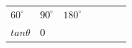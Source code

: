 {{\begin{center}
\begin{tabular}[t]{|l|l|l|l|l|l|l|}
    
        
                  \begin{math}{60}^{\circ }\end{math}
                 &
    
    
        
                  \begin{math}{90}^{\circ }\end{math}
                 &
    
    
        
                  \begin{math}{180}^{\circ }\end{math}
     \tabularnewline\cline{1-1}\cline{2-2}\cline{3-3}\cline{4-4}\cline{5-5}\cline{6-6}\cline{7-7}
    
    
        
                  \begin{math}tan\theta \end{math}
                 &
    
    
        0 &
    
    
        

\end{tabular}
\end{center}}}
